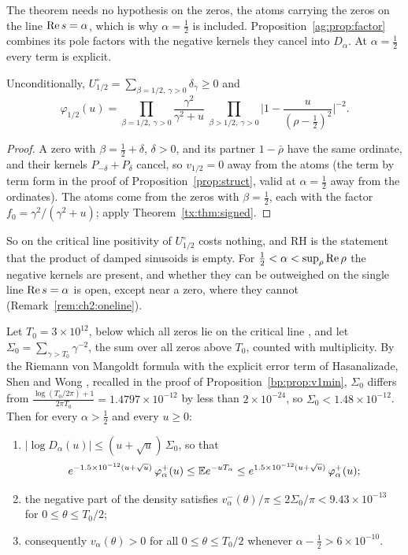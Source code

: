 The theorem needs no hypothesis on the zeros, the atoms carrying the zeros on the line $\operatorname{Re} s=\alpha$, which is why $\alpha=\frac12$ is included. Proposition~\ref{ag:prop:factor} combines its pole factors with the negative kernels they cancel into $D_\alpha$. At $\alpha=\frac12$ every term is explicit.

\begin{corollary}\label{tx:cor:half}
Unconditionally, $U_{1/2}^\circ=\sum_{\beta=1/2,\ \gamma>0}\delta_\gamma\ge0$ and
\[
\varphi_{1/2}(u)=\prod_{\beta=1/2,\ \gamma>0}\frac{\gamma^2}{\gamma^2+u}\ \prod_{\beta>1/2,\ \gamma>0}\Big|1-\frac u{(\rho-\frac12)^2}\Big|^{-2}.
\]
\end{corollary}

\begin{proof}
A zero with $\beta=\frac12+\delta$, $\delta>0$, and its partner $1-\bar\rho$ have the same ordinate, and their kernels $P_{-\delta}+P_\delta$ cancel, so $v_{1/2}=0$ away from the atoms (the term by term form in the proof of Proposition~\ref{prop:struct}, valid at $\alpha=\frac12$ away from the ordinates). The atoms come from the zeros with $\beta=\frac12$, each with the factor $f_0=\gamma^2/(\gamma^2+u)$; apply Theorem~\ref{tx:thm:signed}.
\end{proof}

So on the critical line positivity of $U_{1/2}^\circ$ costs nothing, and RH is the statement that the product of damped sinusoids is empty. For $\frac12<\alpha<\sup_\rho\operatorname{Re}\rho$ the negative kernels are present, and whether they can be outweighed on the single line $\operatorname{Re} s=\alpha$ is open, except near a zero, where they cannot (Remark~\ref{rem:ch2:oneline}).

\begin{theorem}\label{ag:thm:explicit}
Let $T_0=3\times10^{12}$, below which all zeros lie on the critical line \cite{PT21}, and let $\Sigma_0=\sum_{\gamma>T_0}\gamma^{-2}$, the sum over all zeros above $T_0$, counted with multiplicity. By the Riemann von Mangoldt formula with the explicit error term of Hasanalizade, Shen and Wong \cite{HSW22}, recalled in the proof of Proposition~\ref{bp:prop:v1min}, $\Sigma_0$ differs from $\frac{\log(T_0/2\pi)+1}{2\pi T_0}=1.4797\times10^{-12}$ by less than $2\times10^{-24}$, so $\Sigma_0<1.48\times10^{-12}$. Then for every $\alpha>\frac12$ and every $u\ge0$:
\begin{enumerate}
\item $|\log D_\alpha(u)|\le(u+\sqrt u)\,\Sigma_0$, so that
\[
e^{-1.5\times10^{-12}(u+\sqrt u)}\,\varphi_\alpha^+(u)\le\mathbb{E} e^{-uT_\alpha}\le e^{1.5\times10^{-12}(u+\sqrt u)}\,\varphi_\alpha^+(u);
\]
\item the negative part of the density satisfies $v_\alpha^-(\theta)/\pi\le2\Sigma_0/\pi<9.43\times10^{-13}$ for $0\le\theta\le T_0/2$;
\item consequently $v_\alpha(\theta)>0$ for all $0\le\theta\le T_0/2$ whenever $\alpha-\frac12>6\times10^{-10}$.
\end{enumerate}
\end{theorem}

